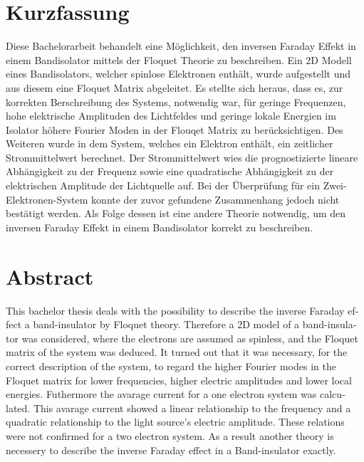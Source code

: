 \thispagestyle{plain}

\section*{Kurzfassung}
Diese Bachelorarbeit behandelt eine Möglichkeit,
den inversen Faraday Effekt
in einem Bandisolator
mittels der Floquet Theorie zu beschreiben.
Ein 2D Modell eines Bandisolators,
welcher spinlose Elektronen enthält,
wurde aufgestellt und aus diesem
eine Floquet Matrix abgeleitet.
Es stellte sich heraus, dass es, zur
korrekten Berschreibung des Systems,
notwendig war,
für geringe Frequenzen, hohe
elektrische Amplituden des Lichtfeldes
und geringe lokale Energien
im Isolator
höhere Fourier Moden
in der Flouqet Matrix zu berücksichtigen.
Des Weiteren wurde in dem System, welches
ein Elektron enthält, ein zeitlicher Strommittelwert
berechnet. Der Strommittelwert wies
die prognostizierte
lineare Abhängigkeit
zu der Frequenz sowie eine quadratische Abhängigkeit
zu der elektrischen Amplitude der Lichtquelle auf.
Bei der Überprüfung für ein Zwei-Elektronen-System
konnte der zuvor gefundene Zusammenhang
jedoch nicht bestätigt werden.
Als Folge dessen
ist eine andere Theorie notwendig,
um den inversen Faraday Effekt
in einem Bandisolator korrekt zu beschreiben.


\section*{Abstract}
\begin{english}
This bachelor thesis deals with the possibility to describe
the inverse Faraday effect a band-insulator by Floquet theory.
Therefore a 2D model of a band-insulator was considered,
where the electrons are assumed as spinless,
and the Floquet matrix of the system
was deduced.
It turned out that it was necessary, for the
correct description of the system, to regard the
higher Fourier modes in the Floquet
matrix for lower frequencies, higher
electric amplitudes
and lower local energies. Futhermore the
avarage current for a one electron system was calculated.
This avarage current showed a linear relationship to the
frequency and a quadratic relationship
to the light source's electric amplitude.
These relations were not
confirmed for a two
electron system.
As a result another theory
is necessery to describe
the inverse Faraday effect
in a Band-insulator exactly.
\end{english}

